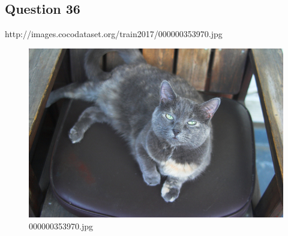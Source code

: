     \subsection*{Question 36}
    http://images.cocodataset.org/train2017/000000353970.jpg
    \begin{figure}[h]
        \centering
        \includegraphics[width=0.8\linewidth]{../image set/easy/000000353970.jpg}
        \caption{000000353970.jpg}
    \end{figure}
